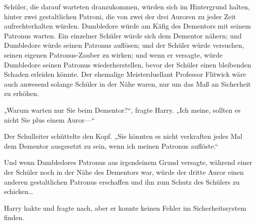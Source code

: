 Schüler, die darauf warteten dranzukommen, würden sich im Hintergrund halten, hinter zwei gestaltlichen Patroni, die von zwei der drei Auroren zu jeder Zeit aufrechterhalten würden. Dumbledore würde am Käfig des Dementors mit seinem Patronus warten. Ein einzelner Schüler würde sich dem Dementor nähern; und Dumbledore würde seinen Patronus auflösen; und der Schüler würde versuchen, seinen eigenen Patronus-Zauber zu wirken; und wenn er versagte, würde Dumbledore seinen Patronus wiederherstellen, bevor der Schüler einen bleibenden Schaden erleiden könnte. Der ehemalige Meisterduellant Professor Flitwick wäre auch anwesend solange Schüler in der Nähe waren, nur um das Maß an Sicherheit zu erhöhen.

„Warum warten nur Sie beim Dementor?“, fragte Harry. „Ich meine, sollten es nicht Sie plus einem Auror—“

Der Schulleiter schüttelte den Kopf. „Sie könnten es nicht verkraften jedes Mal dem Dementor ausgesetzt zu sein, wenn ich meinen Patronus auflöste.“

Und wenn Dumbledores Patronus aus irgendeinem Grund versagte, während einer der Schüler noch in der Nähe des Dementors war, würde der dritte Auror einen anderen gestaltlichen Patronus erschaffen und ihn zum Schutz des Schülers zu schicken…

Harry hakte und fragte nach, aber er konnte keinen Fehler im Sicherheitssystem finden.

